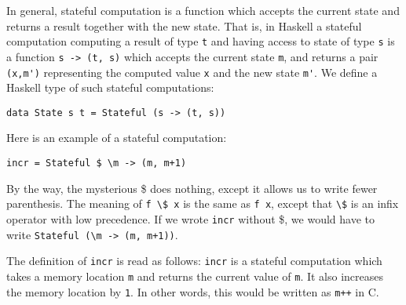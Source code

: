\documentclass[a4paper,10pt]{article}
\newcommand{\cc}[1]{\lstinline{#1}}
\begin{document}
In general, stateful computation is a function which accepts the current state and returns a result together with the new state. That is, in Haskell a stateful computation computing a result of type \cc{t} and having access to state of type \cc{s} is a function \cc{s -> (t, s)}
which accepts the current state \cc{m}, and returns a pair \cc{(x,m')} representing the computed value \cc{x} and the new state \cc{m'}.
%
We define a Haskell type of such stateful computations:
%
\begin{lstlisting}
data State s t = Stateful (s -> (t, s))  
\end{lstlisting}
%
Here is an example of a stateful computation:
%
\begin{lstlisting}
incr = Stateful $ \m -> (m, m+1)  
\end{lstlisting}
By the way, the mysterious \$ does nothing, except it allows us to write fewer parenthesis. The meaning of \cc{f \$ x} is the same as \cc{f x}, except that \cc{\$} is an infix operator with low precedence. If we wrote \cc{incr} without \$, we would have to write \cc{Stateful (\m -> (m, m+1))}.

The definition of \cc{incr} is read as follows: \cc{incr} is a stateful computation which takes a memory location \cc{m} and returns the current value of \cc{m}. It also increases the memory location by \cc{1}. In other words, this would be written as \cc{m++} in C.
\end{document}
